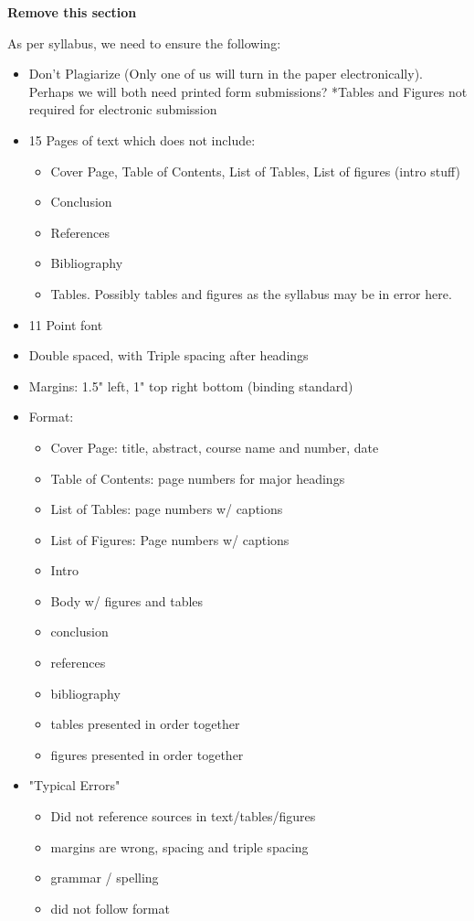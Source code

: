 \vspace{-5mm}
\hrulefill \textbf{Remove this section} \hrulefill
\par
As per syllabus, we need to ensure the following: 
\par
\begin{itemize}

\item Don't Plagiarize (Only one of us will turn in the paper electronically). Perhaps we will both need printed form submissions? *Tables and Figures not required for electronic submission

\item 15 Pages of text which does not include:
\begin{itemize}
    \item Cover Page, Table of Contents, List of Tables, List of figures (intro stuff)
    \item Conclusion
    \item References
    \item Bibliography
    \item Tables.  Possibly tables and figures as the syllabus may be in error here.
\end{itemize}
\item 11 Point font
\item Double spaced, with Triple spacing after headings
\item Margins: 1.5" left, 1" top right bottom (binding standard)
\item Format:
\begin{itemize}
\item Cover Page: title, abstract, course name and number, date
\item Table of Contents: page numbers for major headings
\item List of Tables: page numbers w/ captions
\item List of Figures: Page numbers w/ captions
\item Intro
\item Body w/ figures and tables
\item conclusion
\item references
\item bibliography
\item tables presented in order together
\item figures presented in order together
\end{itemize}
\item "Typical Errors"
\begin{itemize}
\item Did not reference sources in text/tables/figures
\item margins are wrong, spacing and triple spacing
\item grammar / spelling
\item did not follow format
\end{itemize}
\end{itemize}
